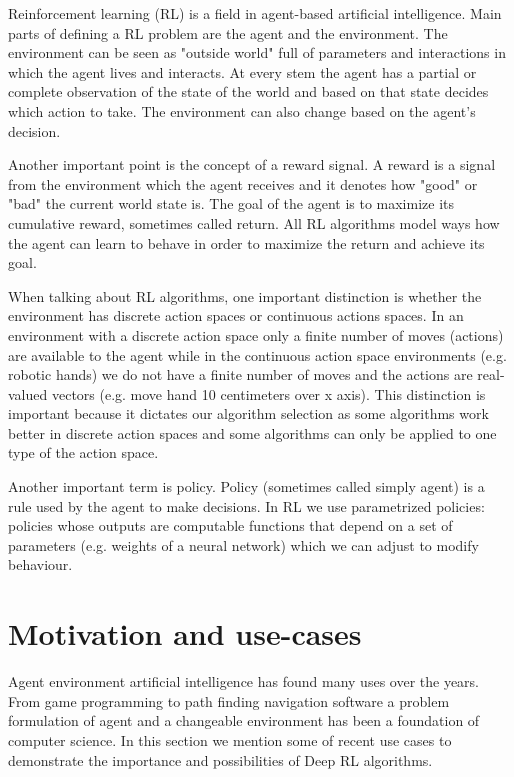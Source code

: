 \documentclass[b5paper]{book}
\begin{document}
Reinforcement learning (RL) is a field in agent-based artificial intelligence. Main parts of defining a RL problem are the agent and the environment. The environment can be seen as "outside world" full of parameters and interactions in which the agent lives and interacts. At every stem the agent has a partial or complete observation of the state of the world and based on that state decides which action to take. The environment can also change based on the agent's decision.

Another important point is the concept of a reward signal. A reward is a signal from the environment which the agent receives and it denotes how "good" or "bad" the current world state is. The goal of the agent is to maximize its cumulative reward, sometimes called return. All RL algorithms model ways how the agent can learn to behave in order to maximize the return and achieve its goal.

When talking about RL algorithms, one important distinction is whether the environment has discrete action spaces or continuous actions spaces. In an environment with a discrete action space only a finite number of moves (actions) are available to the agent while in the continuous action space environments (e.g. robotic hands) we do not have a finite number of moves and the actions are real-valued vectors (e.g. move hand 10 centimeters over x axis). This distinction is important because it dictates our algorithm selection as some algorithms work better in discrete action spaces and some algorithms can only be applied to one type of the action space.

Another important term is policy. Policy (sometimes called simply agent) is a rule used by the agent to make decisions. In RL we use parametrized policies: policies whose outputs are computable functions that depend on a set of parameters (e.g. weights of a neural network) which we can adjust to modify behaviour. 


\section{Motivation and use-cases} 


Agent environment artificial intelligence has found many uses over the years. From game programming to path finding navigation software a problem formulation of agent and a changeable environment has been a foundation of computer science. In this section we mention some of recent use cases to demonstrate the importance and possibilities of Deep RL algorithms.
\end{document}
